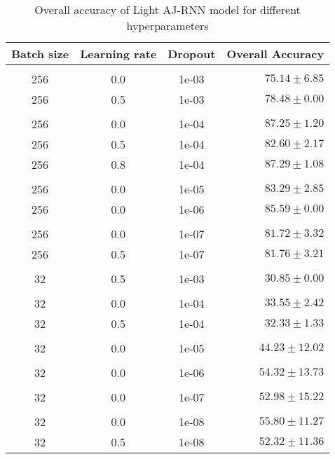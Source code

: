 \begin{table}[!htbp]
  \centering
  \begin{tabular}{cccr} 
      Batch size & Learning rate & Dropout & Overall Accuracy\\[0.2cm] 
      \hline \\[-0.2cm]
      256 & 0.0 & 1e-03 & $75.14 \pm 6.85$\\
      256 & 0.5 & 1e-03 & $78.48 \pm 0.00$\\[0.05cm] \hline \\[-0.25cm]

      256 & 0.0 & 1e-04 & $87.25 \pm 1.20$\\
      256 & 0.5 & 1e-04 & $82.60 \pm 2.17$\\
      256 & 0.8 & 1e-04 & $87.29 \pm 1.08$\\[0.05cm] \hline \\[-0.25cm]

      256 & 0.0 & 1e-05 & $83.29 \pm 2.85$\\
      256 & 0.0 & 1e-06 & $85.59 \pm 0.00$\\[0.05cm] \hline \\[-0.25cm]

      256 & 0.0 & 1e-07 & $81.72 \pm 3.32$\\
      256 & 0.5 & 1e-07 & $81.76 \pm 3.21$\\[0.05cm] \hline \\[-0.25cm]

      32  & 0.5 & 1e-03 & $30.85 \pm 0.00$\\[0.05cm] \hline \\[-0.25cm]

      32  & 0.0 & 1e-04 & $33.55 \pm 2.42$\\
      32  & 0.5 & 1e-04 & $32.33 \pm 1.33$\\[0.05cm] \hline \\[-0.25cm]

      32  & 0.0 & 1e-05 & $44.23 \pm 12.02$\\[0.05cm] \hline \\[-0.25cm]
      32  & 0.0 & 1e-06 & $54.32 \pm 13.73$\\[0.05cm] \hline \\[-0.25cm]
      32  & 0.0 & 1e-07 & $52.98 \pm 15.22$\\[0.05cm] \hline \\[-0.25cm]
      32  & 0.0 & 1e-08 & $55.80 \pm 11.27$\\
      32  & 0.5 & 1e-08 & $52.32 \pm 11.36$\\
  \end{tabular}
  \caption{Overall accuracy of Light AJ-RNN model for different hyperparameters}
  \label{tab:LightAJRNNBatchSizeResults}
\end{table}

